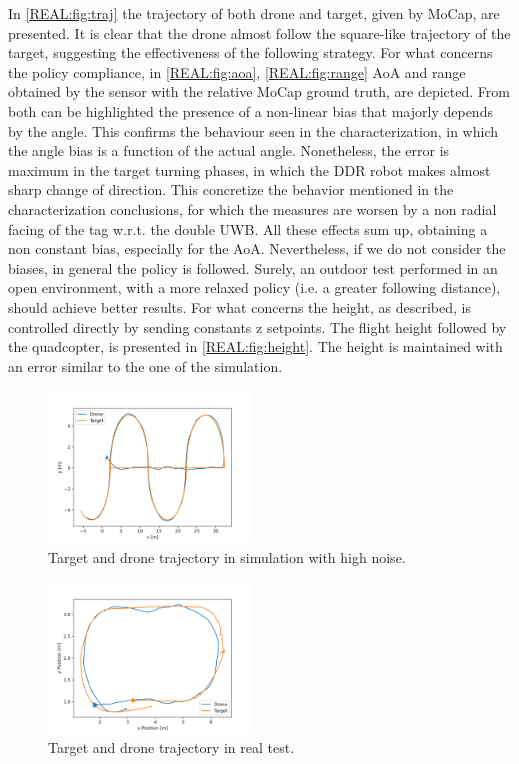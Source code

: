 In \autoref{REAL:fig:traj} the trajectory of both drone and target, given by MoCap, are presented. It is clear that the drone almost follow the square-like trajectory of the target, suggesting the effectiveness of the following strategy. For what concerns the policy compliance, in \autoref{REAL:fig:aoa}, \ref{REAL:fig:range} AoA and range obtained by the sensor with the relative MoCap ground truth, are depicted. From both can be highlighted the presence of a non-linear bias that majorly depends by the angle. This confirms the behaviour seen in the characterization, in which the angle bias is a function of the actual angle. Nonetheless, the error is maximum in the target turning phases, in which the DDR robot makes almost sharp change of direction. This concretize the behavior mentioned in the characterization conclusions, for which the measures are worsen by a non radial facing of the tag w.r.t. the double UWB. All these effects sum up, obtaining a non constant bias, especially for the AoA. Nevertheless, if we do not consider the biases, in general the policy is followed. Surely, an outdoor test performed in an open environment, with a more relaxed policy (i.e. a greater following distance), should achieve better results. For what concerns the height, as described, is controlled directly by sending constants z setpoints. The flight height followed by the quadcopter, is presented in \autoref{REAL:fig:height}. The height is maintained with an error similar to the one of the simulation.\\

\begin{figure}
    \centering
    \includegraphics[width=0.48\textwidth]{images/Simulation/Drone_Target x-y Position_noisy.png}
    \caption{Target and drone trajectory in simulation with high noise.}
    \label{SIM:traj_noisy}
\end{figure}

\begin{figure}
    \centering
    \includegraphics[width=0.48\textwidth]{images/real_test/drone_target_xy_pos.png}
    \caption{Target and drone trajectory in real test.}
    \label{REAL:fig:traj}
\end{figure}

